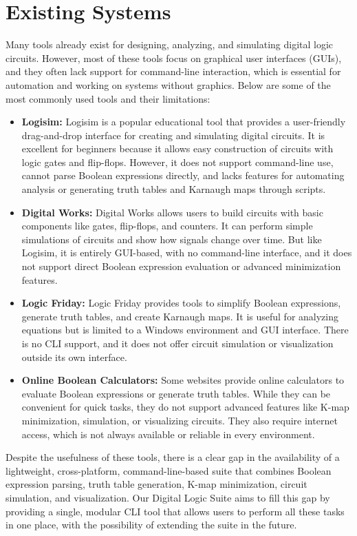 \clearpage

\section{Existing Systems}

Many tools already exist for designing, analyzing, and simulating digital logic circuits. However, most of these tools focus on graphical user interfaces (GUIs), and they often lack support for command-line interaction, which is essential for automation and working on systems without graphics. Below are some of the most commonly used tools and their limitations:

\begin{itemize}
    \item \textbf{Logisim:} Logisim is a popular educational tool that provides a user-friendly drag-and-drop interface for creating and simulating digital circuits. It is excellent for beginners because it allows easy construction of circuits with logic gates and flip-flops. However, it does not support command-line use, cannot parse Boolean expressions directly, and lacks features for automating analysis or generating truth tables and Karnaugh maps through scripts.

    \item \textbf{Digital Works:} Digital Works allows users to build circuits with basic components like gates, flip-flops, and counters. It can perform simple simulations of circuits and show how signals change over time. But like Logisim, it is entirely GUI-based, with no command-line interface, and it does not support direct Boolean expression evaluation or advanced minimization features.

    \item \textbf{Logic Friday:} Logic Friday provides tools to simplify Boolean expressions, generate truth tables, and create Karnaugh maps. It is useful for analyzing equations but is limited to a Windows environment and GUI interface. There is no CLI support, and it does not offer circuit simulation or visualization outside its own interface.

    \item \textbf{Online Boolean Calculators:} Some websites provide online calculators to evaluate Boolean expressions or generate truth tables. While they can be convenient for quick tasks, they do not support advanced features like K-map minimization, simulation, or visualizing circuits. They also require internet access, which is not always available or reliable in every environment.
\end{itemize}

Despite the usefulness of these tools, there is a clear gap in the availability of a lightweight, cross-platform, command-line-based suite that combines Boolean expression parsing, truth table generation, K-map minimization, circuit simulation, and visualization. Our Digital Logic Suite aims to fill this gap by providing a single, modular CLI tool that allows users to perform all these tasks in one place, with the possibility of extending the suite in the future.
